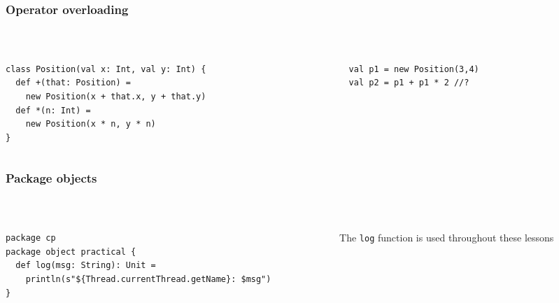 \documentclass[aspectratio=169]{beamer}
\begin{document}
\begin{frame}[fragile]\frametitle{Operator overloading}
~\\[-8mm]
\begin{columns}
\begin{column}{0.56\textwidth}
\begin{lstlisting}
class Position(val x: Int, val y: Int) {
  def +(that: Position) =
    new Position(x + that.x, y + that.y)
  def *(n: Int) =
    new Position(x * n, y * n)
}
\end{lstlisting}
\end{column}
\begin{column}{0.42\textwidth}
\begin{lstlisting}
val p1 = new Position(3,4)
val p2 = p1 + p1 * 2 //?
\end{lstlisting}
\end{column}
\end{columns}
\end{frame}


\begin{frame}[fragile]\frametitle{Package objects}
~\\[-8mm]
\begin{columns}
\begin{column}{0.56\textwidth}
\begin{lstlisting}
package cp
package object practical {
  def log(msg: String): Unit =
    println(s"${Thread.currentThread.getName}: $msg")
}
\end{lstlisting}
\end{column}
\begin{column}{0.42\textwidth}
The \texttt{log} function is used throughout these lessons
\end{column}
\end{columns}
\end{frame}
\end{document}
